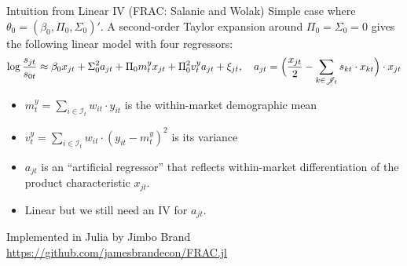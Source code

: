 \documentclass[aspectratio=169,10pt]{beamer}
\begin{document}
\begin{frame}{Intuition from Linear IV (FRAC: Salanie and Wolak)}
Simple case where $\theta_0 = (\beta_0, \Pi_0, \Sigma_0)'$. A second-order Taylor expansion around $\Pi_0 = \Sigma_0 = 0$ gives the following linear model with four regressors:
\begin{equation}
    \label{eq:frac}
    \log\frac{s_{jt}}{s_{0t}} \approx \beta_0 x_{jt} + \Sigma_0^2 a_{jt} + \Pi_0 m_t^y x_{jt} + \Pi_0^2 v_t^y a_{jt} + \xi_{jt}, \quad a_{jt} = \Big(\frac{x_{jt}}{2} - \sum_{k \in \mathscr{J}_t} s_{kt} \cdot x_{kt}\Big) \cdot x_{jt}
\end{equation}
\begin{itemize}
    \item $m_t^y = \sum_{i \in \mathcal{I}_t} w_{it} \cdot y_{it}$ is the within-market demographic mean
    \item $v_t^y = \sum_{i \in \mathcal{I}_t} w_{it} \cdot (y_{it} - m_t^y)^2$ is its variance
    \item $a_{jt}$ is an ``artificial regressor'' that reflects within-market differentiation of the product characteristic $x_{jt}$.\\
    \item Linear but we still need an IV for $a_{jt}$.
\end{itemize}
Implemented in Julia by Jimbo Brand  \url{https://github.com/jamesbrandecon/FRAC.jl}
\end{frame}
\end{document}
